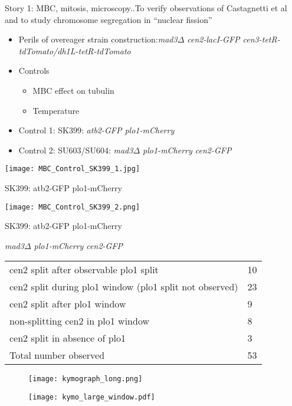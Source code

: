 \begin{frame}[allowframebreaks]{Story 1: MBC, mitosis, microscopy..}{To verify observations of Castagnetti et al and to study chromosome segregation in ``nuclear fission''}

\begin{itemize}
\item Perils of overeager strain construction:{\it mad3$\Delta$ cen2-lacI-GFP cen3-tetR-tdTomato/dh1L-tetR-tdTomato}
\item Controls
	\begin{itemize}
	\item MBC effect on tubulin
	\item Temperature
	\end{itemize}
\item Control 1: SK399: { \it atb2-GFP plo1-mCherry}
\item Control 2: SU603/SU604: {\it mad3$\Delta$ plo1-mCherry cen2-GFP}
\end{itemize}
\framebreak
\begin{center}
\texttt{[image: MBC\_Control\_SK399\_1.jpg]}

SK399: atb2-GFP plo1-mCherry
\end{center}
\framebreak

\begin{center}
\texttt{[image: MBC\_Control\_SK399\_2.png]}

SK399: atb2-GFP plo1-mCherry
\end{center}

\framebreak

\begin{center}
 {\it mad3$\Delta$ plo1-mCherry cen2-GFP}

\begin{tabular}{|l l|}
\hline
cen2 split after observable plo1 split & 10 \\
cen2 split during plo1 window (plo1 split not observed) & 23 \\
cen2 split after plo1 window & 9 \\
non-splitting cen2 in plo1 window & 8 \\
cen2 split in absence of plo1 & 3\\
\hline
Total number observed & 53 \\
\hline
\end{tabular}
\end{center}

\framebreak
\begin{figure}
\centering
\texttt{[image: kymograph\_long.png]}
\end{figure}

\begin{figure}
\texttt{[image: kymo\_large\_window.pdf]}
\end{figure}
\end{frame}
